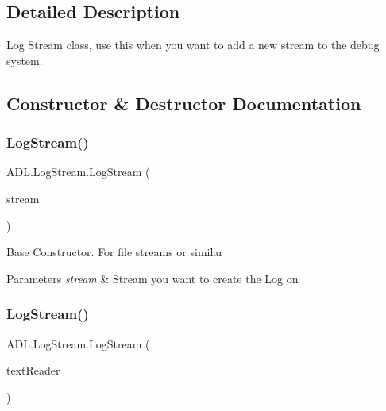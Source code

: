 \subsection{Detailed Description}
Log Stream class, use this when you want to add a new stream to the debug system. 



\subsection{Constructor \& Destructor Documentation}
\mbox{\label{class_a_d_l_1_1_log_stream_a1f2e350b81d2c832024547590d918782}} 
\subsubsection{\texorpdfstring{Log\+Stream()}{LogStream()}\hspace{0.1cm}{\footnotesize\ttfamily [1/2]}}
{\footnotesize\ttfamily A\+D\+L.\+Log\+Stream.\+Log\+Stream (\begin{DoxyParamCaption}\item[{Stream}]{stream }\end{DoxyParamCaption})}



Base Constructor. For file streams or similar 


\begin{DoxyParams}{Parameters}
{\em stream} & Stream you want to create the Log on\\
\hline
\end{DoxyParams}
\mbox{\label{class_a_d_l_1_1_log_stream_a7fa87cb8c69e1c56bfdbd1d09093bb49}} 
\subsubsection{\texorpdfstring{Log\+Stream()}{LogStream()}\hspace{0.1cm}{\footnotesize\ttfamily [2/2]}}
{\footnotesize\ttfamily A\+D\+L.\+Log\+Stream.\+Log\+Stream (\begin{DoxyParamCaption}\item[{Text\+Writer}]{text\+Reader }\end{DoxyParamCaption})}



